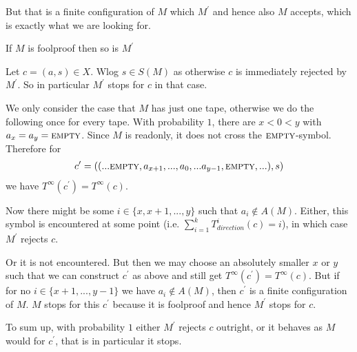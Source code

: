 		But that is a finite configuration of $M$ which $M^\prime$ and hence also $M$ accepts, which is exactly what we are looking for.
\endproof

\begin{Lemma}
	\label{tm_to_tds:properties:lemma_foolproof}
	If $M$ is foolproof then so is $M^\prime$
\end{Lemma}
\proof
	Let $c = (a,s) \in X$. Wlog $s \in S(M)$ as otherwise $c$ is immediately rejected by $M^\prime$. So in particular $M^\prime$ stops for $c$ in that case.

	We only consider the case that $M$ has just one tape, otherwise we do the following once for every tape.
	With probability $1$, there are $x < 0 < y$ with $a_x = a_y = \text{\scshape{empty}}$.
	Since $M$ is readonly, it does not cross the $\text{\scshape{empty}}$-symbol. Therefore for
	\begin{align*}
		c^\prime = ((...\text{\scshape{empty}},a_{x+1},...,a_0,...a_{y-1},\text{\scshape{empty}},...) , s)
	\end{align*} 
	we have $T^\infty(c^\prime) = T^\infty(c)$.

	Now there might be some $i \in \{x,x+1,...,y\}$ such that $a_i \notin A(M)$.
	Either, this symbol is encountered at some point (i.e. $\sum_{i=1}^k T_{direction}^i(c) = i$), in which case $M^\prime$ rejects $c$.

	Or it is not encountered. But then we may choose an absolutely smaller $x$ or $y$ such that we can construct $c^\prime$ as above and still get $T^\infty(c^\prime) = T^\infty(c)$.
	But if for no $i \in \{x+1,...,y-1\}$ we have $a_i \notin A(M)$, then $c^\prime$ is a finite configuration of $M$.
	$M$ stops for this $c^\prime$ because it is foolproof and hence $M^\prime$ stops for $c$.

	To sum up, with probability $1$ either $M^\prime$ rejects $c$ outright, or it behaves as $M$ would for $c^\prime$, that is in particular it stops.
\endproof

